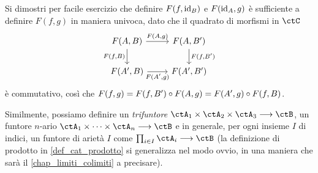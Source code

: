 Si dimostri per facile esercizio che definire \(F(f,\mathrm{id}_B)\) e \(F(\mathrm{id}_A,g)\) è sufficiente a definire \(F(f,g)\) in maniera univoca, dato che il quadrato di morfismi in \(\ctC\)
\[
	\begin{tikzcd}
		F(A,B) \ar[r, "{F(A,g)}"]\ar[d, "{F(f,B)}"'] & F(A,B') \ar[d, "{F(f,B')}"]\\
		F(A',B) \ar[r, "{F(A',g)}"'] & F(A',B')
	\end{tikzcd}
\]
è commutativo, così che $F(f,g)=F(f,B')\circ F(A,g) = F(A',g)\circ F(f,B)$.
\begin{notation}
	Similmente, possiamo definire un \emph{trifuntore} \(\ctA_1\times\ctA_2\times\ctA_3\fun\ctB\), un funtore \(n\)-ario \(\ctA_1\times\dots\times\ctA_n\fun\ctB\) e in generale, per ogni insieme \(I\) di indici, un funtore di arietà \(I\) come \(\prod_{i\in I}\ctA_i\fun\ctB\) (la definizione di prodotto in \ref{def_cat_prodotto} si generalizza nel modo ovvio, in una maniera che sarà il \autoref{chap_limiti_colimiti} a precisare).
\end{notation}
